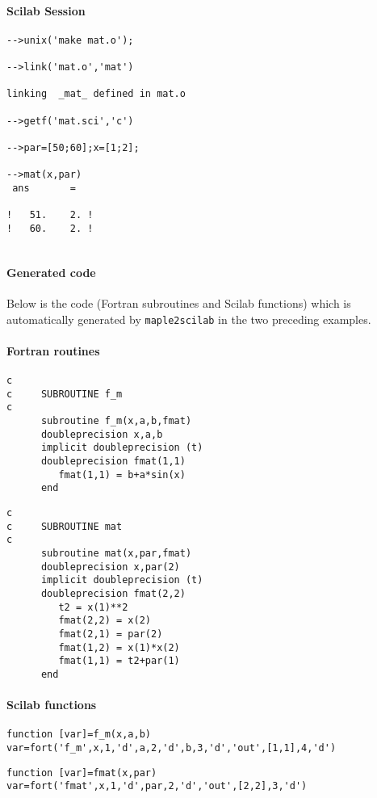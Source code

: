 \paragraph{Scilab Session}
\begin{verbatim}
-->unix('make mat.o');

-->link('mat.o','mat') 

linking  _mat_ defined in mat.o  
 
-->getf('mat.sci','c')

-->par=[50;60];x=[1;2];
 
-->mat(x,par)
 ans       =
 
!   51.    2. !
!   60.    2. !
 
\end{verbatim}

{\small
\paragraph{Generated code}
Below is the code (Fortran subroutines and Scilab functions) which is 
automatically generated by {\tt maple2scilab} in the two preceding  examples.
\paragraph{Fortran routines}
\begin{verbatim}
c      
c     SUBROUTINE f_m
c      
      subroutine f_m(x,a,b,fmat)
      doubleprecision x,a,b
      implicit doubleprecision (t)
      doubleprecision fmat(1,1)
         fmat(1,1) = b+a*sin(x)
      end
\end{verbatim}
\begin{verbatim}
c      
c     SUBROUTINE mat
c      
      subroutine mat(x,par,fmat)
      doubleprecision x,par(2)
      implicit doubleprecision (t)
      doubleprecision fmat(2,2)
         t2 = x(1)**2
         fmat(2,2) = x(2)
         fmat(2,1) = par(2)
         fmat(1,2) = x(1)*x(2)
         fmat(1,1) = t2+par(1)
      end
\end{verbatim}
\paragraph{Scilab functions}
\begin{verbatim}
function [var]=f_m(x,a,b)
var=fort('f_m',x,1,'d',a,2,'d',b,3,'d','out',[1,1],4,'d')
\end{verbatim}
\begin{verbatim}
function [var]=fmat(x,par)
var=fort('fmat',x,1,'d',par,2,'d','out',[2,2],3,'d')
\end{verbatim}
}
%



